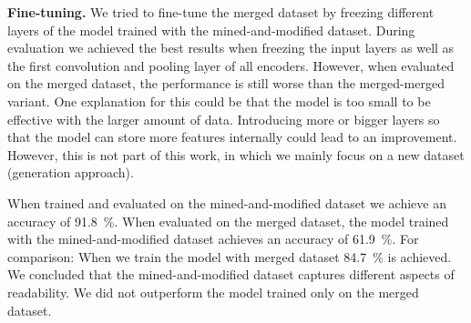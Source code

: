 \documentclass[%
class=scrreprt,
chapterprefix=false,%
open=right,%
twoside=false,%
paper=a4,%
logofile={Logo\_zentral\_farbig\_EN.png},%
thesistype=master,%
UKenglish,%
]{se2thesis}
\theoremstyle{definition}
\newenvironment{researchbox}[1]{\begin{tcolorbox}[colback=blue!10!white,colframe=blue!50!black,title=#1]}{\end{tcolorbox}}
\begin{document}
	
	
	\textbf{Fine-tuning.}
	We tried to fine-tune the merged dataset by freezing different layers of the model trained with the mined-and-modified dataset. During evaluation we achieved the best results when freezing the input layers as well as the first convolution and pooling layer of all encoders. 
	However, when evaluated on the merged dataset, the performance is still worse than the merged-merged variant.
	One explanation for this could be that the model is too small to be effective with the larger amount of data. Introducing more or bigger layers so that the model can store more features internally could lead to an improvement. However, this is not part of this work, in which we mainly focus on a new dataset (generation approach).
	
	\begin{researchbox}{Summary (RQ3 - new-data):}
		When trained and evaluated on the mined-and-modified dataset we achieve an accuracy of 91.8~\%.
		When evaluated on the merged dataset, the model trained with the mined-and-modified dataset achieves an accuracy of 61.9~\%. For comparison: When we train the model with merged dataset 84.7~\% is achieved.
		We concluded that the mined-and-modified dataset captures different aspects of readability. 
		We did not outperform the model trained only on the merged dataset.
	\end{researchbox}
	
\end{document}
